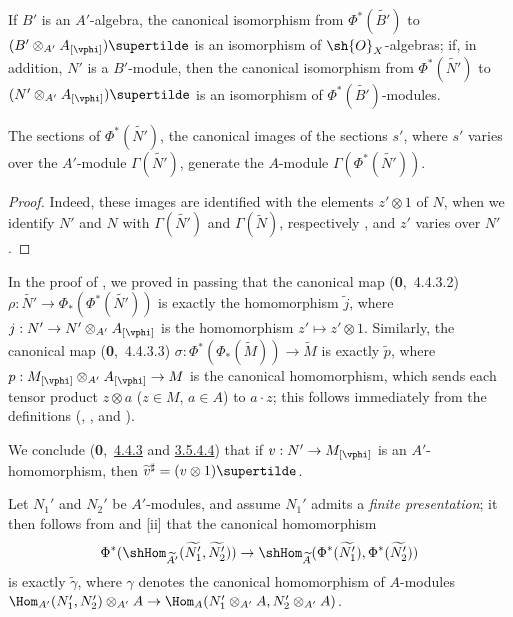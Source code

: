 If $B'$ is an $A'$-algebra, the canonical isomorphism from $\Phi^*(\widetilde{B'})$ to $(B'\otimes_{A'}A_{[\vphi]})\supertilde$ is an isomorphism of $\sh{O}_X$-algebras;
if, in addition, $N'$ is a $B'$-module, then the canonical isomorphism from $\Phi^*(\widetilde{N'})$ to $(N'\otimes_{A'}A_{[\vphi]})\supertilde$ is an isomorphism of $\Phi^*(\widetilde{B'})$-modules.

\begin{corollary}[1.6.6]
\label{I.1.6.6}
The sections of $\Phi^*(\widetilde{N'})$, the canonical images of the sections $s'$, where $s'$ varies over the $A'$-module $\Gamma(\widetilde{N'})$, generate the $A$-module $\Gamma(\Phi^*(\widetilde{N'}))$.
\end{corollary}

\begin{proof}
Indeed, these images are identified with the elements $z'\otimes 1$ of $N$, when we identify $N'$ and $N$ with $\Gamma(\widetilde{N'})$ and $\Gamma(\widetilde{N})$, respectively , and $z'$ varies over $N'$.
\end{proof}

\begin{env}[1.6.7]
\label{I.1.6.7}
In the proof of , we proved in passing that the canonical map (\textbf{0},~4.4.3.2) $\rho:\widetilde{N'}\to\Phi_*(\Phi^*(\widetilde{N'}))$ is exactly the homomorphism $\widetilde{j}$,
where $j:N'\to N'\otimes_{A'}A_{[\vphi]}$ is the homomorphism $z'\mapsto z'\otimes 1$.
Similarly, the canonical map (\textbf{0},~4.4.3.3) $\sigma:\Phi^*(\Phi_*(\widetilde{M}))\to\widetilde{M}$ is exactly $\widetilde{p}$, where $p:M_{[\vphi]}\otimes_{A'}A_{[\vphi]}\to M$ is the canonical homomorphism, which sends each tensor product $z\otimes a$ ($z\in M$, $a\in A$) to $a\cdot z$;
this follows immediately from the definitions (, , and ).

We conclude (\textbf{0},~\hyperref[0.4.4.3]{4.4.3} and \hyperref[0.3.5.4.4]{3.5.4.4}) that if $v:N'\to M_{[\vphi]}$ is an $A'$-homomorphism, then $\widetilde{v}^\sharp=(v\otimes 1)\supertilde$.
\end{env}

\begin{env}[1.6.8]
\label{I.1.6.8}
Let $N_1'$ and $N_2'$ be $A'$-modules, and assume $N_1'$ admits a \emph{finite presentation};
it then follows from  and [ii] that the
canonical homomorphism 
\[
  \Phi^*(\shHom_{\widetilde{A'}}(\widetilde{N_1'},\widetilde{N_2'}))
  \to\shHom_{\widetilde{A}}(\Phi^*(\widetilde{N_1'}),\Phi^*(\widetilde{N_2'}))
\]
is exactly $\widetilde{\gamma}$, where $\gamma$ denotes the canonical homomorphism of $A$-modules $\Hom_{A'}(N_1',N_2')\otimes_{A'}A\to\Hom_A(N_1'\otimes_{A'}A,N_2'\otimes_{A'}A)$.
\end{env}

